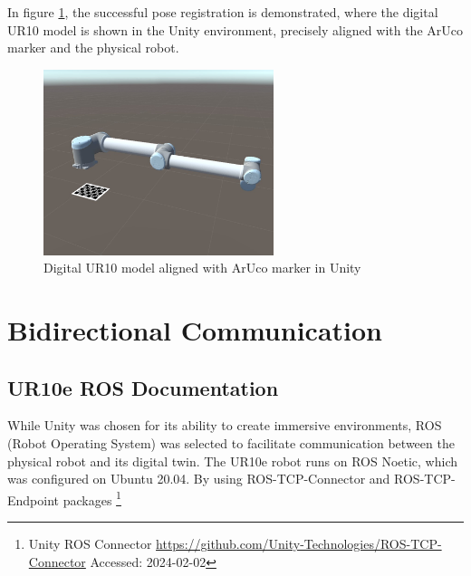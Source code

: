 In figure \ref{f:ur10_marker_unity}, the successful pose registration is demonstrated, where the digital UR10 model is shown in the Unity environment, precisely aligned with the ArUco marker and the physical robot.

\begin{figure}[h]
    \centering
    \includegraphics[width=0.6\textwidth]{figs/robot_marker_unity.jpg}
    \caption{Digital UR10 model aligned with ArUco marker in Unity}
    \label{f:ur10_marker_unity}
\end{figure}

\section{Bidirectional Communication}

\subsection{UR10e ROS Documentation}
While Unity was chosen for its ability to create immersive environments, ROS (Robot Operating System) was selected to facilitate communication between the physical robot and its digital twin. The UR10e robot runs on ROS Noetic, which was configured on Ubuntu 20.04. By using ROS-TCP-Connector and ROS-TCP-Endpoint packages \footnote{Unity ROS Connector \url{https://github.com/Unity-Technologies/ROS-TCP-Connector} Accessed: 2024-02-02}

